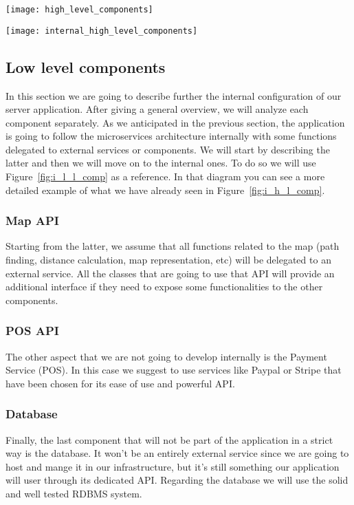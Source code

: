 \begin{sidewaysfigure}
\centering
\texttt{[image: high\_level\_components]}
\caption{Component view: High Level Architecture}
\label{fig:h_l_comp}
\end{sidewaysfigure}

\begin{sidewaysfigure}
\centering
\texttt{[image: internal\_high\_level\_components]}
\caption{Component view: Internal High Level Architecture}
\label{fig:i_h_l_comp}
\end{sidewaysfigure}

\pagebreak
\subsection{Low level components}
In this section we are going to describe further the internal configuration of our server
application. After giving a general overview, we will analyze each component separately.
As we anticipated in the previous section, the application is going to follow the microservices
architecture internally with some functions delegated to external services or components.
We will start by describing the latter and then we will move on to the internal ones.
To do so we will use Figure~\ref{fig:i_l_l_comp} as a reference.
In that diagram you can see a more detailed example of what we have already seen
in Figure~\ref{fig:i_h_l_comp}.

\subsubsection{Map API}
Starting from the latter, we assume that all functions related to the map (path finding,
distance calculation, map representation, etc) will be delegated to an external service.
All the classes that are going to use that API will provide an additional interface if they 
need to expose some functionalities to the other components.
\subsubsection{POS API}
The other aspect that we are not going to develop internally is the Payment Service (POS).
In this case we suggest to use services like Paypal or Stripe that have been chosen
for its ease of use and powerful API.
\subsubsection{Database}
Finally, the last component that will not be part of the application in a strict way is the database.
It won't be an entirely external service since we are going to host and mange it in our infrastructure,
but it's still something our application will user through its dedicated API. Regarding the
database we will use the solid and well tested RDBMS system.

